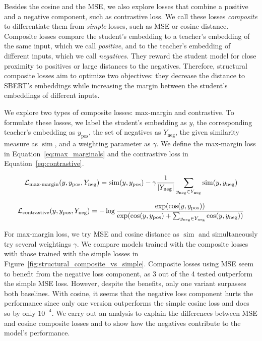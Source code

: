 Besides the cosine and the MSE, we also explore losses that combine a positive
and a negative component, such as contrastive loss. We call these losses
\emph{composite} to differentiate them from \emph{simple} losses, such as MSE or cosine
distance. Composite losses compare the student's embedding to a teacher's
embedding of the same input, which we call \emph{positive}, and to
the teacher's embedding of different inputs, which we call
\emph{negatives}. They reward the student model for close proximity to
positives or large distances to the negatives. Therefore, structural composite
losses aim to optimize two objectives: they decrease the distance to SBERT's embeddings
while increasing the margin between the student's embeddings of different inputs.

We explore two types of composite losses: max-margin and contrastive. To
formulate these losses, we label the student's embedding as $y$, the
corresponding teacher's embedding as $y_{\text{pos}}$, the set of negatives as
$Y_{\text{neg}}$, the given similarity measure as $\operatorname{sim}$, and a
weighting parameter as $\gamma$. We define the max-margin loss in
Equation~\ref{eq:max_marginals} and the contrastive loss in
Equation~\ref{eq:contrastive}.

\begin{equation}
  \mathcal{L}_{\text{max-margin}}(y, y_\text{pos}, Y_\text{neg}) =
    \operatorname{sim}(y, y_\text{pos}) -
    \gamma \frac{1}{|Y_\text{neg}|} \sum_{y_\text{neg} \in Y_\text{neg}}
      \operatorname{sim}(y, y_\text{neg})
  \label{eq:max_marginals}
\end{equation}

\begin{equation}
  \mathcal{L}_{\text{contrastive}}(y, y_\text{pos}, Y_\text{neg}) =
    -\log \frac{
      \exp(\cos(y, y_\text{pos}))
    }{
      \exp(
        \cos(y, y_\text{pos}) +
        \sum_{y_\text{neg} \in Y_\text{neg}} \cos(y, y_\text{neg})
      )
    }
  \label{eq:contrastive}
\end{equation}

For max-margin loss, we try MSE and cosine distance as $\operatorname{sim}$ and
simultaneously try several weightings $\gamma$. We compare models trained with
the composite losses with those trained with the simple losses in
Figure~\ref{fig:structural_composite_vs_simple}. Composite losses using MSE
seem to benefit from the negative loss component, as 3 out of the 4 tested outperform the
simple MSE loss. However, despite the benefits, only one variant surpasses both
baselines. With cosine, it seems that the negative loss component hurts the
performance since only one version outperforms the simple cosine loss and does
so by only $10^{-4}$. We carry out an analysis to explain the differences
between MSE and cosine composite losses and to show how the negatives
contribute to the model's performance.

